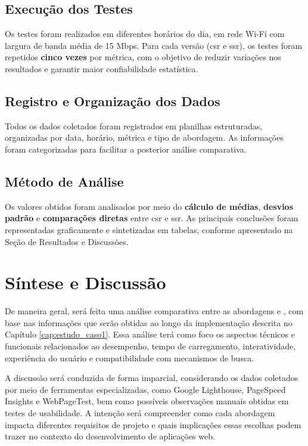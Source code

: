 \subsection{Execução dos Testes}

Os testes foram realizados em diferentes horários do dia, em rede Wi-Fi com largura de banda média de 15 Mbps. Para cada versão (\acrshort{csr} e \acrshort{ssr}), os testes foram repetidos \textbf{cinco vezes} por métrica, com o objetivo de reduzir variações nos resultados e garantir maior confiabilidade estatística.

\subsection{Registro e Organização dos Dados}

Todos os dados coletados foram registrados em planilhas estruturadas, organizadas por data, horário, métrica e tipo de abordagem. As informações foram categorizadas para facilitar a posterior análise comparativa.

\subsection{Método de Análise}

Os valores obtidos foram analisados por meio do \textbf{cálculo de médias}, \textbf{desvios padrão} e \textbf{comparações diretas} entre \acrshort{csr} e \acrshort{ssr}. As principais conclusões foram representadas graficamente e sintetizadas em tabelas, conforme apresentado na Seção de Resultados e Discussões.

\section{Síntese e Discussão}
\label{sec:sintese-e-discussao}

De maneira geral, será feita uma análise comparativa entre as abordagens  e , com base nas informações que serão obtidas ao longo da implementação descrita no Capítulo \ref{cap:estudo_caso1}. Essa análise terá como foco os aspectos técnicos e funcionais relacionados ao desempenho, tempo de carregamento, interatividade, experiência do usuário e compatibilidade com mecanismos de busca.

A discussão será conduzida de forma imparcial, considerando os dados coletados por meio de ferramentas especializadas, como Google Lighthouse, PageSpeed Insights e WebPageTest, bem como possíveis observações manuais obtidas em testes de usabilidade. A intenção será compreender como cada abordagem impacta diferentes requisitos de projeto e quais implicações essas escolhas podem trazer no contexto do desenvolvimento de aplicações web.

